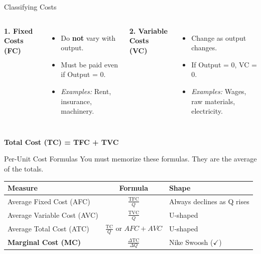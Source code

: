 \documentclass[aspectratio=169]{beamer}
\begin{document}
\begin{frame}{Classifying Costs}
    \begin{columns}
        \textbf{1. Fixed Costs (FC)}
        \begin{itemize}
            \item Do \textbf{not} vary with output.
            \item Must be paid even if Output = 0.
            \item \textit{Examples:} Rent, insurance, machinery.
        \end{itemize}
        
        \textbf{2. Variable Costs (VC)}
        \begin{itemize}
            \item Change as output changes.
            \item If Output = 0, VC = 0.
            \item \textit{Examples:} Wages, raw materials, electricity.
        \end{itemize}
    \end{columns}
    
    \vspace{0.5cm}
    \begin{center}
        \Large \textbf{Total Cost (TC) = TFC + TVC}
    \end{center}
\end{frame}

\begin{frame}{Per-Unit Cost Formulas}
    You must memorize these formulas. They are the average of the totals.
    
    \begin{table}
        \centering
        \renewcommand{\arraystretch}{1.5}
        \begin{tabular}{l c l}
            \toprule
            \textbf{Measure} & \textbf{Formula} & \textbf{Shape} \\
            \midrule
            Average Fixed Cost (AFC) & $\frac{\text{TFC}}{Q}$ & Always declines as Q rises \\
            Average Variable Cost (AVC) & $\frac{\text{TVC}}{Q}$ & U-shaped \\
            Average Total Cost (ATC) & $\frac{\text{TC}}{Q} \text{ or } AFC + AVC$ & U-shaped \\
            \textbf{Marginal Cost (MC)} & $\frac{\Delta \text{TC}}{\Delta Q}$ & Nike Swoosh ($\checkmark$) \\
            \bottomrule
        \end{tabular}
    \end{table}
\end{frame}
\end{document}
